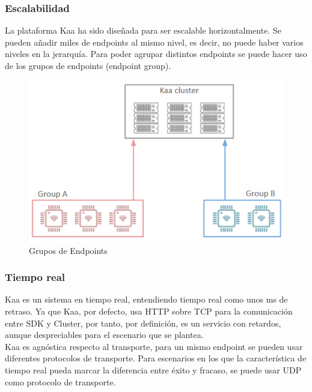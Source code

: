 \documentclass[12pt, twoside]{book}
\begin{document}
\subsubsection*{Escalabilidad}
La plataforma Kaa ha sido diseñada para ser escalable horizontalmente. Se pueden añadir miles de endpoints al mismo nivel, es decir, no puede haber varios niveles en la jerarquía. Para poder agrupar distintos endpoints se puede hacer uso de los grupos de endpoints (endpoint group). 
\begin{figure}[H]
\centering
\includegraphics[scale=0.6]{images/endpoint_group.png}
\caption{Grupos de Endpoints}\label{L508}
\end{figure}
\subsubsection*{Tiempo real}
Kaa es un sistema en tiempo real, entendiendo tiempo real como unos ms de retraso. Ya que Kaa, por defecto, usa HTTP sobre TCP para la comunicación entre SDK y Cluster, por tanto, por definición, es un servicio con retardos, aunque despreciables para el escenario que se plantea.\\  Kaa es agnóstica respecto al transporte, para un mismo endpoint se pueden usar diferentes protocolos de transporte. Para escenarios en los que la característica de tiempo real pueda marcar la diferencia entre éxito y fracaso, se puede usar UDP como protocolo de transporte.
\end{document}
